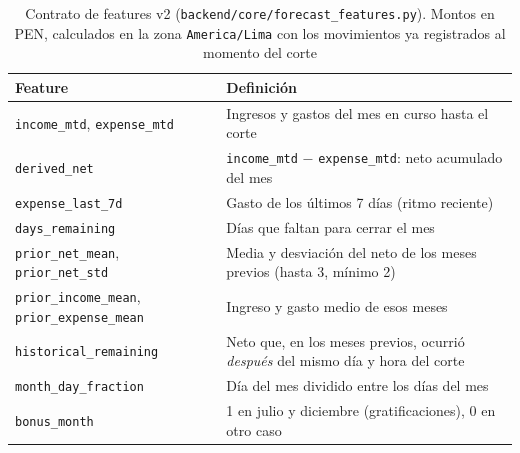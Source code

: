 \begin{table}[H]
    \centering
    \small
    \caption{Contrato de features v2 (\texttt{backend/core/forecast\_features.py}). Montos en PEN, calculados en la zona \texttt{America/Lima} con los movimientos ya registrados al momento del corte}
    \label{tab:mlops-features}
    \begin{tabularx}{\textwidth}{@{}L{4.2cm} Y@{}}
        \toprule
        \textbf{Feature} & \textbf{Definición} \\
        \midrule
        \texttt{income\_mtd}, \texttt{expense\_mtd} & Ingresos y gastos del mes en curso hasta el corte \\
        \texttt{derived\_net} & \texttt{income\_mtd} $-$ \texttt{expense\_mtd}: neto acumulado del mes \\
        \texttt{expense\_last\_7d} & Gasto de los últimos 7 días (ritmo reciente) \\
        \texttt{days\_remaining} & Días que faltan para cerrar el mes \\
        \texttt{prior\_net\_mean}, \texttt{prior\_net\_std} & Media y desviación del neto de los meses previos (hasta 3, mínimo 2) \\
        \texttt{prior\_income\_mean}, \texttt{prior\_expense\_mean} & Ingreso y gasto medio de esos meses \\
        \texttt{historical\_remaining} & Neto que, en los meses previos, ocurrió \emph{después} del mismo día y hora del corte \\
        \texttt{month\_day\_fraction} & Día del mes dividido entre los días del mes \\
        \texttt{bonus\_month} & 1 en julio y diciembre (gratificaciones), 0 en otro caso \\
        \bottomrule
    \end{tabularx}
\end{table}
